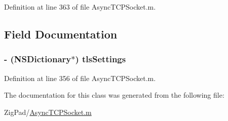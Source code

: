 Definition at line 363 of file AsyncTCPSocket.m.



\subsection{Field Documentation}
\hypertarget{interface_async_special_packet_a868321fcf00287d41712aec8a30616bf}{
\subsubsection[{tlsSettings}]{\setlength{\rightskip}{0pt plus 5cm}-\/ (NSDictionary$\ast$) {\bf tlsSettings}}}
\label{interface_async_special_packet_a868321fcf00287d41712aec8a30616bf}


Definition at line 356 of file AsyncTCPSocket.m.



The documentation for this class was generated from the following file:\begin{DoxyCompactItemize}
\item 
ZigPad/\hyperlink{_async_t_c_p_socket_8m}{AsyncTCPSocket.m}\end{DoxyCompactItemize}
